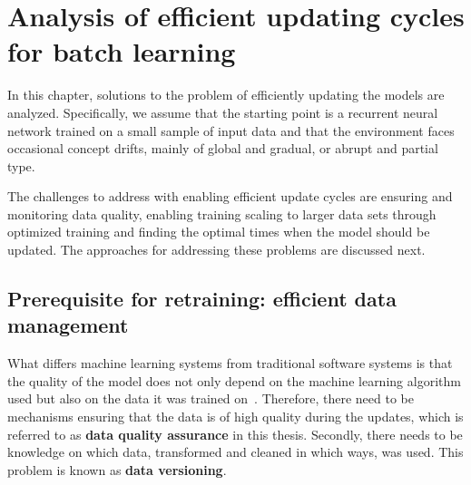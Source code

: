 



\chapter{Analysis of efficient updating cycles for batch learning}

In this chapter, solutions to the problem of efficiently updating the models are analyzed. Specifically, we assume that the starting point is a recurrent neural network trained on a small sample of input data and that the environment faces occasional concept drifts, mainly of global and gradual, or abrupt and partial type.

The challenges to address with enabling efficient update cycles are ensuring and monitoring data quality, enabling training scaling to larger data sets through optimized training and finding the optimal times when the model should be updated. The approaches for addressing these problems are discussed next.

\section[Prerequisite for retraining: efficient data management]{Prerequisite for retraining: efficient data \\management}

What differs machine learning systems from traditional software systems is that the quality of the model does not only depend on the machine learning algorithm used but also on the data it was trained on~\cite{polyzotisDataLifecycleChallenges2018}. Therefore, there need to be mechanisms ensuring that the data is of high quality during the updates, which is referred to as \textbf{data quality assurance} in this thesis. Secondly, there needs to be knowledge on which data, transformed and cleaned in which ways, was used. This problem is known as \textbf{data versioning}.

